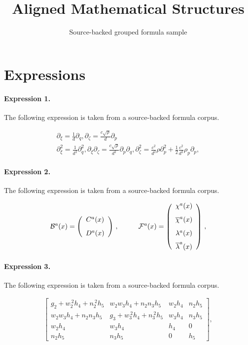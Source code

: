 \documentclass[11pt]{article}
\title{Aligned Mathematical Structures}
\author{Source-backed grouped formula sample}
\date{}
\begin{document}
\maketitle
\section{Expressions}
\paragraph{Expression 1.} The following expression is taken from a source-backed formula corpus.

\begin{gather*} \partial_\xi = \frac{1}{d}\partial_q, \partial_\zeta = \frac{c\sqrt{\rho}}{d} \partial_p \\\partial_{\xi}^2 = \frac{1}{d^2} \partial_q^2, \partial_\xi \partial_\zeta = \frac{c \sqrt{\rho}}{d^2} \partial_p \partial_q, \partial_\zeta^2 = \frac{c^2}{d^2} \rho \partial_p^2 + \frac{1}{2} \frac{c^2}{d^2} \rho_p \partial_p, \end{gather*}

\paragraph{Expression 2.} The following expression is taken from a source-backed formula corpus.

\begin{align*}{\cal B}^{a}(x) = \left( \begin{array}{c} C^{a}(x) \\ \rule{0pt}{16pt} D^{a}(x) \end{array} \right) \, , \hspace{1cm} {\cal F}^{a}(x) = \left( \begin{array}{c} \chi^{a}(x) \\{\overline \chi}^{a}(x) \rule{0pt}{16pt} \\ \lambda^{a}(x) \rule{0pt}{16pt} \\ {\overline \lambda}^{a}(x) \rule{0pt}{16pt} \end{array} \right) \, , \end{align*}

\paragraph{Expression 3.} The following expression is taken from a source-backed formula corpus.

\begin{align*}\left[\begin{array}{cccc}g_{2}+w_{2}^{\ 2}h_{4}+n_{2}^{\ 2}h_{5} & w_{2}w_{3}h_{4}+n_{2}n_{3}h_{5} &w_{2}h_{4} & n_{2}h_{5} \\w_{2}w_{3}h_{4}+n_{2}n_{3}h_{5} & g_{3}+w_{3}^{\ 2}h_{4}+n_{3}^{\ 2}h_{5} &w_{3}h_{4} & n_{3}h_{5} \\w_{2}h_{4} & w_{3}h_{4} & h_{4} & 0 \\n_{2}h_{5} & n_{3}h_{5} & 0 & h_{5}\end{array}\right] , \end{align*}
\end{document}
